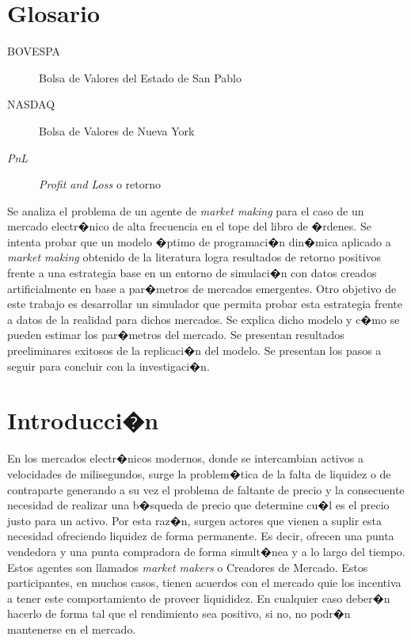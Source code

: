 \documentclass[12pt,a4paper,spanish]{article}%
\begin{document}



\tableofcontents
\thispagestyle{empty}

\newpage



\listoffigures


\section*{Glosario}
\begin{description}
	\item[BOVESPA] Bolsa de Valores del Estado de San Pablo
	\item[NASDAQ] Bolsa de Valores de Nueva York
	\item[\textit{PnL}] \textit{Profit and Loss} o retorno
\end{description}

\hfill \break

Se analiza el problema de un agente de \textit{market making} para el caso de un mercado electr�nico de alta frecuencia en el tope del libro de �rdenes. Se intenta probar que un modelo �ptimo de programaci�n din�mica aplicado a \textit{market making} obtenido de la literatura logra resultados de retorno positivos frente a una estrategia base en un entorno de simulaci�n con datos creados artificialmente en base a par�metros de mercados emergentes. Otro objetivo de este trabajo es desarrollar un simulador que permita probar esta estrategia frente a datos de la realidad para dichos mercados. Se explica dicho modelo y c�mo se pueden estimar los par�metros del mercado. Se presentan resultados preeliminares exitosos de la replicaci�n del modelo. Se presentan los pasos a seguir para concluir con la investigaci�n.

\section{Introducci�n}
En los mercados electr�nicos modernos, donde se intercambian activos a velocidades de milisegundos, surge la problem�tica de la falta de liquidez o de contraparte generando a su vez el problema de faltante de precio y la consecuente necesidad de realizar una b�squeda de precio que determine cu�l es el precio justo para un activo. Por esta raz�n, surgen actores que vienen a suplir esta necesidad ofreciendo liquidez de forma permanente. Es decir, ofrecen una punta vendedora y una punta compradora de forma simult�nea y a lo largo del tiempo. Estos agentes son llamados \textit{market makers} o Creadores de Mercado. Estos participantes, en muchos casos, tienen acuerdos con el mercado quie los incentiva a tener este comportamiento de proveer liquididez. En cualquier caso deber�n hacerlo de forma tal que el rendimiento sea positivo, si no, no podr�n mantenerse en el mercado.
\end{document}
